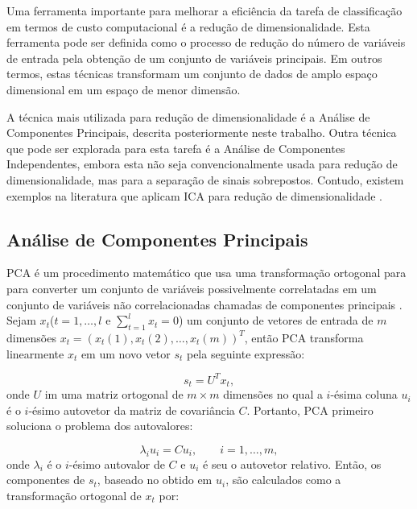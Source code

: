 Uma ferramenta importante para melhorar a eficiência da tarefa de classificação em termos de custo computacional é a redução de dimensionalidade. Esta ferramenta pode ser definida como o processo de redução do número de variáveis de entrada pela obtenção de um conjunto de variáveis principais. Em outros termos, estas técnicas transformam um conjunto de dados de amplo espaço dimensional em um espaço de menor dimensão.

A técnica mais utilizada para redução de dimensionalidade é a Análise de Componentes Principais, descrita posteriormente neste trabalho. Outra técnica que pode ser explorada para esta tarefa é a Análise de Componentes Independentes, embora esta não seja convencionalmente usada para redução de dimensionalidade, mas para a separação de sinais sobrepostos. Contudo, existem exemplos na literatura que aplicam ICA para redução de dimensionalidade \cite{wang2006independent} \cite{cao2003comparison}.

\subsection{Análise de Componentes Principais}

PCA é um procedimento matemático que usa uma transformação ortogonal para para converter um conjunto de variáveis possivelmente correlatadas em um conjunto de variáveis não correlacionadas chamadas de componentes principais \cite{wold1987principal}. Sejam $x_t$($t=1,\ldots,l$ e $\sum_{t=1}^{l}{x_t}=0$) um conjunto de vetores de entrada de $m$ dimensões ${x_t}=({x_t}(1),{x_t}(2),\ldots,{x_t}(m))^T$, então PCA transforma linearmente $x_t$ em um novo vetor $s_t$ pela seguinte expressão:

\begin{equation}\label{eq:pca1}
	{s_t} = {U^T}{x_t},
\end{equation}
onde $U$ im uma matriz ortogonal de  $m \times m$ dimensões no qual a  $i$-ésima coluna $u_i$ é o $i$-ésimo autovetor da matriz de covariância  $C$. Portanto, PCA primeiro soluciona o problema dos autovalores:

\begin{equation}\label{eq:pca2}
	{\lambda _i}{u_i} = C{u_i}, \qquad i=1,\ldots,m,
\end{equation}
onde $\lambda _i$ é o $i$-ésimo autovalor de $C$ e ${u_i}$ é seu o autovetor relativo. Então, os componentes de ${s_t}$, baseado no obtido em ${u_i}$, são calculados como a transformação ortogonal de ${x_t}$ por:

